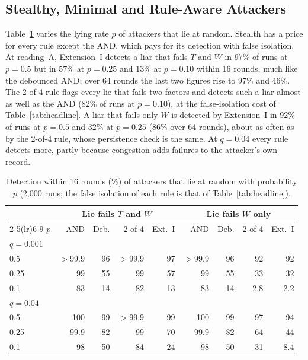 \documentclass[lineno,pdflatex,sn-nature]{sn-jnl}
\theoremstyle{thmstyleone}%
\theoremstyle{thmstylethree}%
\begin{document}
\subsection{Stealthy, Minimal and Rule-Aware Attackers}
\label{sec:res-stealth}
Table~\ref{tab:stealth} varies the lying rate $p$ of attackers that lie
at random.  Stealth has a price for every rule except the AND, which
pays for its detection with false isolation.  At reading~A,
Extension~I detects a liar that fails $T$ and $W$ in $97\%$ of runs at
$p=0.5$ but in $57\%$ at $p=0.25$ and $13\%$ at $p=0.10$ within
16 rounds, much like the debounced AND; over 64 rounds the last two
figures rise to $97\%$ and $46\%$.  The 2-of-4 rule flags every lie
that fails two factors and detects such a liar almost as well as the
AND ($82\%$ of runs at $p=0.10$), at the false-isolation cost of
Table~\ref{tab:headline}.  A liar that fails only $W$ is
detected by Extension~I in $92\%$ of runs at $p=0.5$ and $32\%$ at
$p=0.25$ ($86\%$ over 64 rounds), about as often as by the 2-of-4
rule, whose persistence check is the same.  At $q=0.04$ every rule detects more, partly because
congestion adds failures to the attacker's own record.

\begin{table}[!t]
\caption{Detection within 16 rounds (\%) of attackers that lie at random with probability $p$ (2{,}000 runs; the false isolation of each rule is that of Table~\ref{tab:headline}).}
\label{tab:stealth}
\centering
\renewcommand{\arraystretch}{1.08}
\footnotesize
\setlength{\tabcolsep}{1.6pt}
\begin{tabular}{lrrrrrrrr}
\toprule
 & \multicolumn{4}{c}{{Lie fails $T$ and $W$}} & \multicolumn{4}{c}{{Lie fails $W$ only}} \\
\cmidrule(lr){2-5}\cmidrule(lr){6-9}
$p$ & AND & Deb. & 2-of-4 & Ext.~I & AND & Deb. & 2-of-4 & Ext.~I \\
\midrule
\multicolumn{9}{l}{$q=0.001$} \\
0.5 & $>$99.9 & 96 & $>$99.9 & 97 & $>$99.9 & 96 & 92 & 92 \\
0.25 & 99 & 55 & 99 & 57 & 99 & 55 & 33 & 32 \\
0.1 & 83 & 14 & 82 & 13 & 83 & 14 & 2.8 & 2.2 \\
\midrule
\multicolumn{9}{l}{$q=0.04$} \\
0.5 & 100 & 99 & $>$99.9 & 99 & 100 & 99 & 97 & 94 \\
0.25 & 99.9 & 82 & 99 & 70 & 99.9 & 82 & 64 & 44 \\
0.1 & 98 & 50 & 84 & 24 & 98 & 50 & 31 & 8.4 \\
\bottomrule
\end{tabular}
\end{table}
\end{document}

